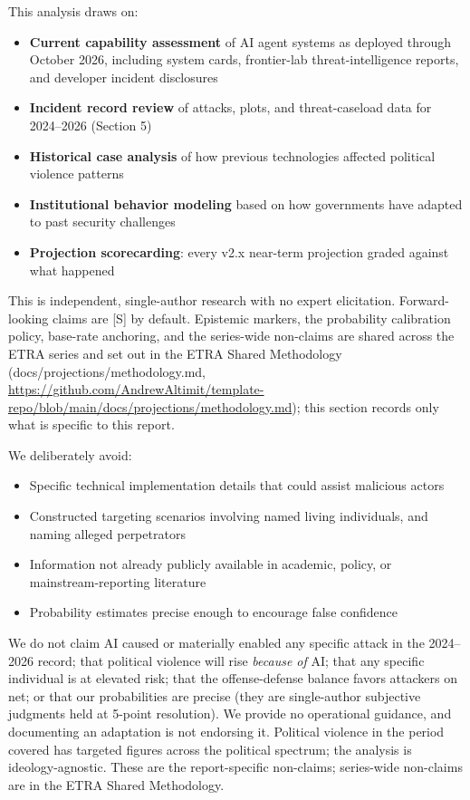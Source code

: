 \documentclass[11pt,letterpaper]{article}
\begin{document}
This analysis draws on:
\begin{itemize}
  \item \textbf{Current capability assessment} of AI agent systems as deployed through October 2026, including system cards, frontier-lab threat-intelligence reports, and developer incident disclosures
  \item \textbf{Incident record review} of attacks, plots, and threat-caseload data for 2024--2026 (Section 5)
  \item \textbf{Historical case analysis} of how previous technologies affected political violence patterns
  \item \textbf{Institutional behavior modeling} based on how governments have adapted to past security challenges
  \item \textbf{Projection scorecarding}: every v2.x near-term projection graded against what happened
\end{itemize}

This is independent, single-author research with no expert elicitation. Forward-looking claims are [S] by default. Epistemic markers, the probability calibration policy, base-rate anchoring, and the series-wide non-claims are shared across the ETRA series and set out in the ETRA Shared Methodology (docs/projections/methodology.md, \url{https://github.com/AndrewAltimit/template-repo/blob/main/docs/projections/methodology.md}); this section records only what is specific to this report.

We deliberately avoid:
\begin{itemize}[nosep]
  \item Specific technical implementation details that could assist malicious actors
  \item Constructed targeting scenarios involving named living individuals, and naming alleged perpetrators
  \item Information not already publicly available in academic, policy, or mainstream-reporting literature
  \item Probability estimates precise enough to encourage false confidence
\end{itemize}

\begin{warnbox}
We do not claim AI caused or materially enabled any specific attack in the 2024--2026 record; that political violence will rise \textit{because of} AI; that any specific individual is at elevated risk; that the offense-defense balance favors attackers on net; or that our probabilities are precise (they are single-author subjective judgments held at 5-point resolution). We provide no operational guidance, and documenting an adaptation is not endorsing it. Political violence in the period covered has targeted figures across the political spectrum; the analysis is ideology-agnostic. These are the report-specific non-claims; series-wide non-claims are in the ETRA Shared Methodology.
\end{warnbox}
\end{document}
